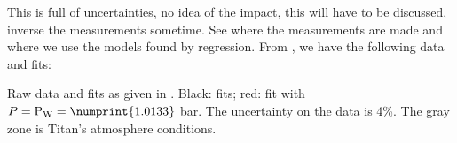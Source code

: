 \pagebreak
\begin{remark}
This is full of uncertainties, no idea of the impact, this will have to be discussed, inverse the measurements
sometime. See where the measurements are made and where we use the models found by regression.
From \citet{Wakeham1973,Massman1998}, we have the following data and
fits:\medskip\\
\centerline{}
{Raw data and fits as given in \citet{Wakeham1973,Massman1998}.
Black: \citet{Wakeham1973} fits; red: \citet{Massman1998} fit with $P = \mathrm{P_W} = \numprint{1.0133}~$bar.
The uncertainty on the data is 4\%. The gray zone is Titan's atmosphere conditions.}
\medskip


\end{remark}
